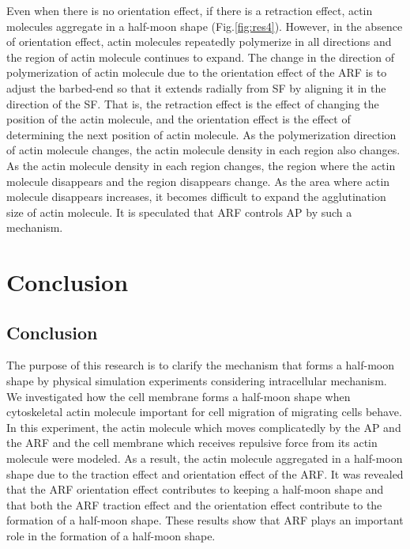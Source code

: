 \documentclass[a4paper,12pt, oneside]{book}
\begin{document}
Even when there is no orientation effect, if there is a retraction effect, actin molecules aggregate in a half-moon shape (Fig.\ref{fig:res4}).
However, in the absence of orientation effect, actin molecules repeatedly polymerize in all directions and the region of actin molecule continues to expand.
The change in the direction of polymerization of actin molecule due to the orientation effect of the ARF is to adjust the barbed-end so that it extends radially from SF by aligning it in the direction of the SF.
That is, the retraction effect is the effect of changing the position of the actin molecule, and the orientation effect is the effect of determining the next position of actin molecule.
As the polymerization direction of actin molecule changes, the actin molecule density in each region also changes.
As the actin molecule density in each region changes, the region where the actin molecule disappears and the region disappears change.
As the area where actin molecule disappears increases, it becomes difficult to expand the agglutination size of actin molecule.
It is speculated that ARF controls AP by such a mechanism.

\chapter{Conclusion}
\section{Conclusion}
The purpose of this research is to clarify the mechanism that forms a half-moon shape by physical simulation experiments considering intracellular mechanism.
We investigated how the cell membrane forms a half-moon shape when cytoskeletal actin molecule important for cell migration of migrating cells behave.
In this experiment, the actin molecule which moves complicatedly by the AP and the ARF and the cell membrane which receives repulsive force from its actin molecule were modeled.
As a result, the actin molecule aggregated in a half-moon shape due to the traction effect and orientation effect of the ARF.
It was revealed that the ARF orientation effect contributes to keeping a half-moon shape and that both the ARF traction effect and the orientation effect contribute to the formation of a half-moon shape.
These results show that ARF plays an important role in the formation of a half-moon shape.
\end{document}
